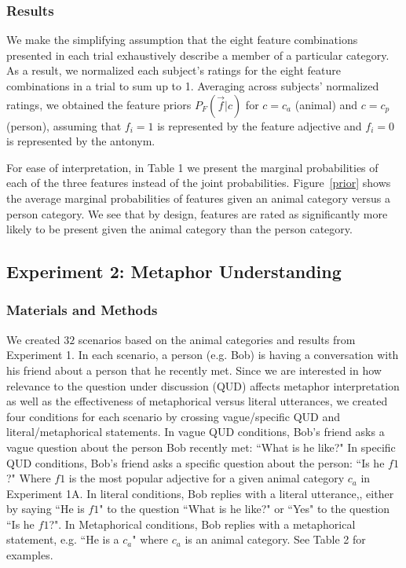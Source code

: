 \documentclass[10pt,letterpaper]{article}
\begin{document}
\subsubsection{Results} 
We make the simplifying assumption that the eight feature combinations presented in each trial exhaustively describe a member of a particular category. As a result, we normalized each subject's ratings for the eight feature combinations in a trial to sum up to 1. Averaging across subjects' normalized ratings, we obtained the feature priors $P_F(\vec f | c)$ for $c = c_a$ (animal) and $c = c_p$ (person), assuming that $f_i = 1$ is represented by the feature adjective and $f_i = 0$ is represented by the antonym. 

For ease of interpretation, in Table 1 we present the marginal probabilities of each of the three features instead of the joint probabilities. Figure~\ref{prior} shows the average marginal probabilities of features given an animal category versus a person category. We see that by design, features are rated as significantly more likely to be present given the animal category than the person category.

\subsection{Experiment 2: Metaphor Understanding}
\subsubsection{Materials and Methods}
We created $32$ scenarios based on the animal categories and results from Experiment 1. In each scenario, a person (e.g. Bob) is having a conversation with his friend about a person that he recently met. Since we are interested in how relevance to the question under discussion (QUD) affects metaphor interpretation as well as the effectiveness of metaphorical versus literal utterances, we created four conditions for each scenario by crossing vague/specific QUD and literal/metaphorical statements. In vague QUD conditions, Bob's friend asks a vague question about the person Bob recently met: ``What is he like?" In specific QUD conditions, Bob's friend asks a specific question about the person: ``Is he $f1$?" Where $f1$ is the most popular adjective for a given animal category $c_a$ in Experiment 1A. In literal conditions, Bob replies with a literal utterance,, either by saying ``He is $f1$" to the question ``What is he like?" or ``Yes" to the question ``Is he $f1$?". In Metaphorical conditions, Bob replies with a metaphorical statement, e.g. ``He is a $c_a$" where $c_a$ is an animal category. See Table 2 for examples.
 
\end{document}
